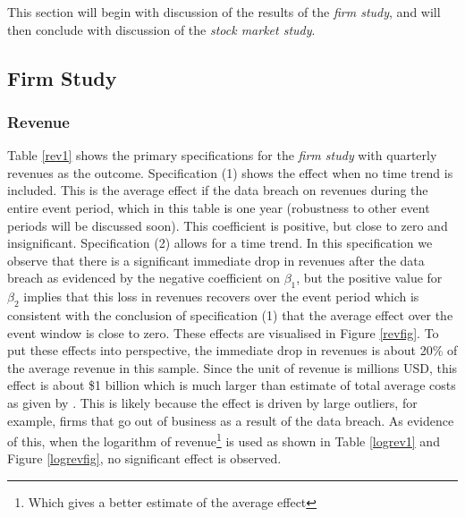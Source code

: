 \documentclass[../Main.tex]{subfiles}
\begin{document}
This section will begin with discussion of the results of the \textit{firm study}, and will then conclude with discussion of the \textit{stock market study}.

\subsection{Firm Study}

\subsubsection{Revenue}

Table \ref{rev1} shows the primary specifications for the \textit{firm study} with quarterly revenues as the outcome. Specification (1) shows the effect when no time trend is included. This is the average effect if the data breach on revenues during the entire event period, which in this table is one year (robustness to other event periods will be discussed soon). This coefficient is positive, but close to zero and insignificant. Specification (2) allows for a time trend. In this specification we observe that there is a significant immediate drop in revenues after the data breach as evidenced by the negative coefficient on $\beta_1$, but the positive value for $\beta_2$ implies that this loss in revenues recovers over the event period which is consistent with the conclusion of specification (1) that the average effect over the event window is close to zero. These effects are visualised in Figure \ref{revfig}. To put these effects into perspective, the immediate drop in revenues is about 20\% of the average revenue in this sample. Since the unit of revenue is millions USD, this effect is about \$1 billion which is much larger than estimate of total average costs as given by \cite{ponemon2018}. This is likely because the effect is driven by large outliers, for example, firms that go out of business as a result of the data breach. As evidence of this, when the logarithm of revenue\footnote{Which gives a better estimate of the average effect} is used as shown in Table \ref{logrev1} and Figure \ref{logrevfig}, no significant effect is observed. 
\end{document}
